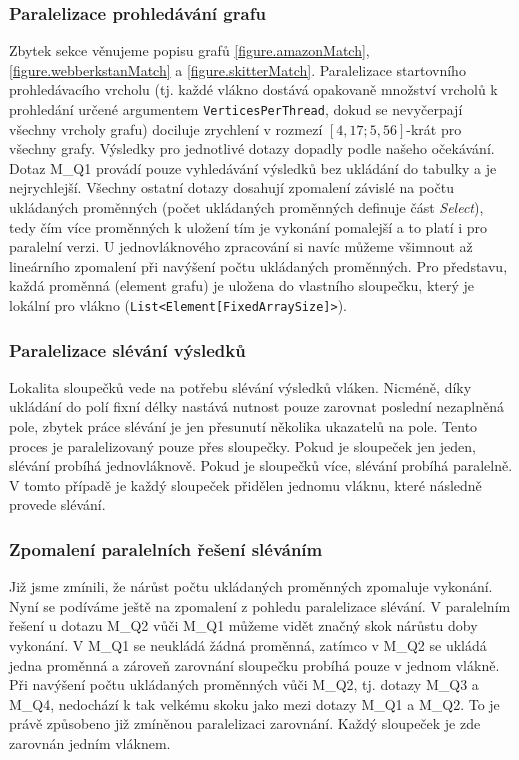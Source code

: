 \subsubsection{Paralelizace prohledávání grafu}

Zbytek sekce věnujeme popisu grafů \ref{figure.amazonMatch}, \ref{figure.webberkstanMatch} a \ref{figure.skitterMatch}. 
Paralelizace startovního prohledávacího vrcholu (tj. každé vlákno dostává opakovaně množství vrcholů k prohledání určené argumentem \verb+VerticesPerThread+, dokud se nevyčerpají všechny vrcholy grafu) dociluje zrychlení v rozmezí $[4,17; 5,56]$-krát pro všechny grafy.
Výsledky pro jednotlivé dotazy dopadly podle našeho očekávání. 
Dotaz M\_Q1 provádí pouze vyhledávání výsledků bez ukládání do tabulky a je nejrychlejší. 
Všechny ostatní dotazy dosahují zpomalení závislé na počtu ukládaných proměnných (počet ukládaných proměnných definuje část \textit{Select}), tedy čím více proměnných k uložení tím je vykonání pomalejší a to platí i pro paralelní verzi. 
U jednovláknového zpracování si navíc můžeme všimnout až lineárního zpomalení při navýšení počtu ukládaných proměnných.
Pro představu, každá proměnná (element grafu) je uložena do vlastního sloupečku, který je lokální pro vlákno (\verb+List<Element[FixedArraySize]>+). 

\subsubsection{Paralelizace slévání výsledků}

Lokalita sloupečků vede na potřebu slévání výsledků vláken.
Nicméně, díky ukládání do polí fixní délky nastává nutnost pouze zarovnat poslední nezaplněná pole, zbytek práce slévání je jen přesunutí několika ukazatelů na pole. 
Tento proces je paralelizovaný pouze přes sloupečky.
Pokud je sloupeček jen jeden, slévání probíhá jednovláknově.
Pokud je sloupečků více, slévání probíhá paralelně.
V tomto případě je každý sloupeček přidělen jednomu vláknu, které následně provede slévání. 

\subsubsection{Zpomalení paralelních řešení sléváním}

Již jsme zmínili, že nárůst počtu ukládaných proměnných zpomaluje vykonání.
Nyní se podíváme ještě na zpomalení z pohledu paralelizace slévání.
V paralelním řešení u dotazu M\_Q2 vůči M\_Q1 můžeme vidět značný skok nárůstu doby vykonání.
V M\_Q1 se neukládá žádná proměnná, zatímco v M\_Q2 se ukládá jedna proměnná a zároveň zarovnání sloupečku probíhá pouze v jednom vlákně.
Při navýšení počtu ukládaných proměnných vůči M\_Q2, tj. dotazy M\_Q3 a M\_Q4, nedochází k tak velkému skoku jako mezi dotazy M\_Q1 a M\_Q2.
To je právě způsobeno již zmíněnou paralelizaci zarovnání.
Každý sloupeček je zde zarovnán jedním vláknem.  

